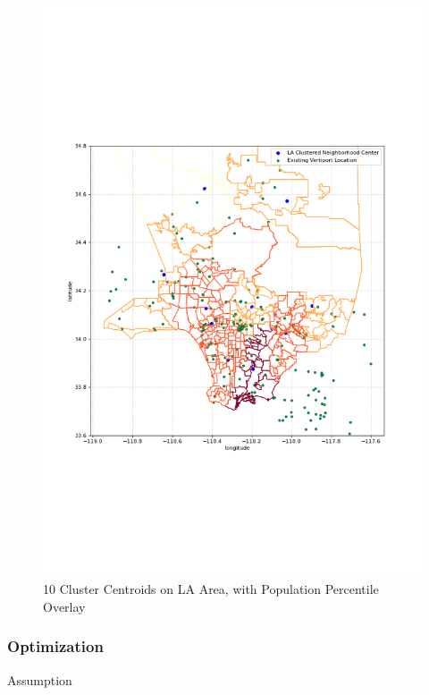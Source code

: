 \documentclass{article}
\begin{document}
\begin{figure}[ht]
\centering
\includegraphics[width=\textwidth]{proj04.png}
\caption{10 Cluster Centroids on LA Area, with Population Percentile Overlay }
\label{fig:proj04}
\end{figure}

\subsubsection{Optimization}

Assumption
\end{document}
